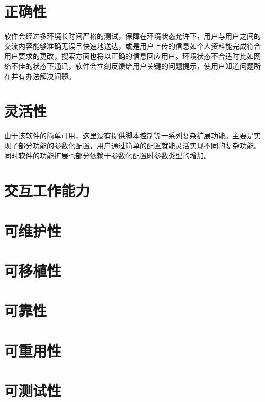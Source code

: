 \section{正确性}
软件会经过多环境长时间严格的测试，保障在环境状态允许下，用户与用户之间的交流内容能够准确无误且快速地送达，或是用户上传的信息如个人资料能完成符合用户要求的更改，搜索方面也将以正确的信息回应用户。环境状态不合适时比如网络不佳的状态下通讯，软件会立刻反馈给用户关键的问题提示，使用户知道问题所在并有办法解决问题。

\section{灵活性}
由于该软件的简单可用，这里没有提供脚本控制等一系列复杂扩展功能。主要是实现了部分功能的参数化配置，用户通过简单的配置就能灵活实现不同的复杂功能。同时软件的功能扩展也部分依赖于参数化配置时参数类型的增加。

\section{交互工作能力}

\section{可维护性}

\section{可移植性}

\section{可靠性}

\section{可重用性}

\section{可测试性}

